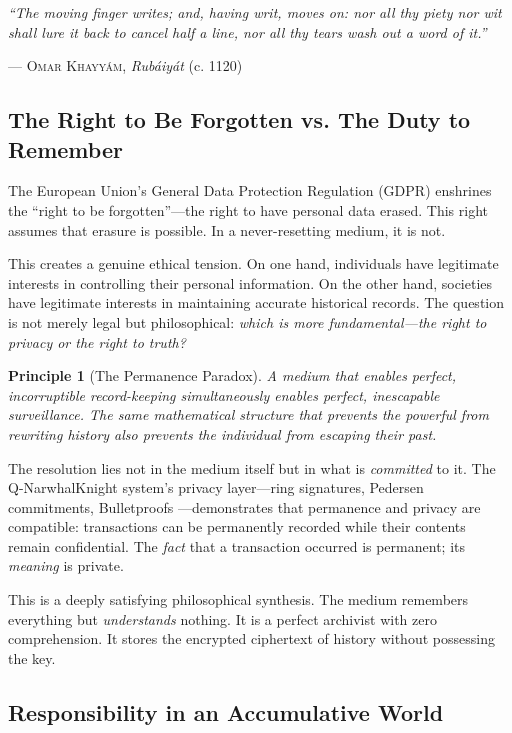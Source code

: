 \documentclass[12pt,a4paper]{article}
\theoremstyle{philosophical}
\newtheorem{principle}{Principle}
\begin{document}
\epigraph{\textit{``The moving finger writes; and, having writ, moves on: nor all thy piety nor wit shall lure it back to cancel half a line, nor all thy tears wash out a word of it.''}}{\textsc{--- Omar Khayy\'am}, \textit{Rub\'aiy\'at} (c. 1120)}

\subsection{The Right to Be Forgotten vs. The Duty to Remember}

The European Union's General Data Protection Regulation (GDPR) enshrines the ``right to be forgotten''---the right to have personal data erased. This right assumes that erasure is possible. In a never-resetting medium, it is not.

This creates a genuine ethical tension. On one hand, individuals have legitimate interests in controlling their personal information. On the other hand, societies have legitimate interests in maintaining accurate historical records. The question is not merely legal but philosophical: \emph{which is more fundamental---the right to privacy or the right to truth?}

\begin{principle}[The Permanence Paradox]
A medium that enables perfect, incorruptible record-keeping simultaneously enables perfect, inescapable surveillance. The same mathematical structure that prevents the powerful from rewriting history also prevents the individual from escaping their past.
\end{principle}

The resolution lies not in the medium itself but in what is \emph{committed} to it. The Q-NarwhalKnight system's privacy layer---ring signatures, Pedersen commitments, Bulletproofs \cite{qnk-physics}---demonstrates that permanence and privacy are compatible: transactions can be permanently recorded while their contents remain confidential. The \emph{fact} that a transaction occurred is permanent; its \emph{meaning} is private.

This is a deeply satisfying philosophical synthesis. The medium remembers everything but \emph{understands} nothing. It is a perfect archivist with zero comprehension. It stores the encrypted ciphertext of history without possessing the key.

\subsection{Responsibility in an Accumulative World}
\end{document}
